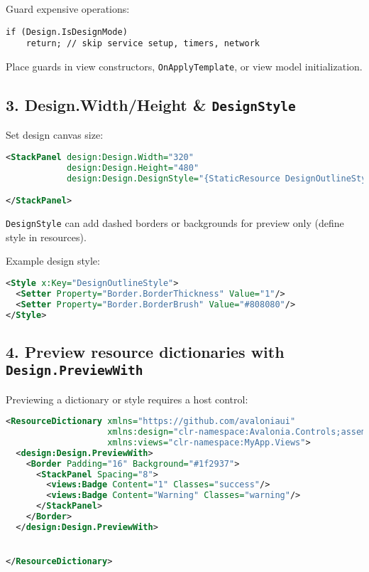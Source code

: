 Guard expensive operations:

\begin{lstlisting}
if (Design.IsDesignMode)
    return; // skip service setup, timers, network
\end{lstlisting}

Place guards in view constructors,
\passthrough{\lstinline!OnApplyTemplate!}, or view model initialization.

\subsection{\texorpdfstring{3. Design.Width/Height \&
\texttt{DesignStyle}}{3. Design.Width/Height \& DesignStyle}}\label{design.widthheight-designstyle}

Set design canvas size:

\begin{lstlisting}[language=XML]
<StackPanel design:Design.Width="320"
            design:Design.Height="480"
            design:Design.DesignStyle="{StaticResource DesignOutlineStyle}">

</StackPanel>
\end{lstlisting}

\passthrough{\lstinline!DesignStyle!} can add dashed borders or
backgrounds for preview only (define style in resources).

Example design style:

\begin{lstlisting}[language=XML]
<Style x:Key="DesignOutlineStyle">
  <Setter Property="Border.BorderThickness" Value="1"/>
  <Setter Property="Border.BorderBrush" Value="#808080"/>
</Style>
\end{lstlisting}

\subsection{\texorpdfstring{4. Preview resource dictionaries with
\texttt{Design.PreviewWith}}{4. Preview resource dictionaries with Design.PreviewWith}}\label{preview-resource-dictionaries-with-design.previewwith}

Previewing a dictionary or style requires a host control:

\begin{lstlisting}[language=XML]
<ResourceDictionary xmlns="https://github.com/avaloniaui"
                    xmlns:design="clr-namespace:Avalonia.Controls;assembly=Avalonia.Controls"
                    xmlns:views="clr-namespace:MyApp.Views">
  <design:Design.PreviewWith>
    <Border Padding="16" Background="#1f2937">
      <StackPanel Spacing="8">
        <views:Badge Content="1" Classes="success"/>
        <views:Badge Content="Warning" Classes="warning"/>
      </StackPanel>
    </Border>
  </design:Design.PreviewWith>


</ResourceDictionary>
\end{lstlisting}

